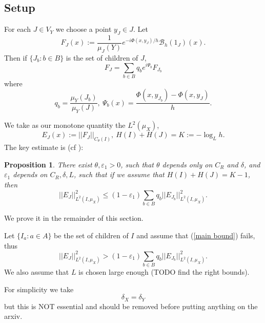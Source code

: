 \documentclass[reqno,10pt]{amsart}
\newtheorem{proposition}[theorem]{Proposition}
\theoremstyle{definition}
\numberwithin{equation}{section}
\begin{document}
\subsection{Setup}
For each $J \in V_Y$ we choose a point $y_J \in J$.
Let
$$F_J(x) := \frac{1}{\mu_J(Y)} e^{-i\Phi(x, y_J)/h} \mathcal B_h(1_J)(x).$$
Then if $\{J_b: b \in B\}$ is the set of children of $J$,
\begin{equation}\label{F versus child}
F_J = \sum_{b \in B} q_b e^{i\Psi_b} F_{J_b}
\end{equation}
where 
$$q_b = \frac{\mu_Y(J_b)}{\mu_Y(J)}, ~\Psi_b(x) = \frac{\Phi(x, y_{J_b}) - \Phi(x, y_J)}{h}.$$

We take as our monotone quantity the $L^2(\mu_X)$,
$$E_J(x) := ||F_J||_{C_\theta(I)}, ~H(I) + H(J) = K := -\log_L h.$$
The key estimate is (cf \cite[(3.11)]{Dyatlov_2018}):

\begin{proposition}
There exist $\theta, \varepsilon_1 > 0$, such that $\theta$ depends only on $C_R$ and $\delta$, and $\varepsilon_1$ depends on $C_R, \delta, L$, such that if we assume that $H(I) + H(J) = K - 1$, then
\begin{equation}\label{main bound}
||E_J||_{L^2(I, \mu_X)}^2 \leq (1 - \varepsilon_1) \sum_{b \in B} q_b ||E_{J_b}||_{L^2(I, \mu_X)}^2.
\end{equation}
\end{proposition}

We prove it in the remainder of this section.

Let $\{I_a: a \in A\}$ be the set of children of $I$ and assume that (\ref{main bound}) fails, thus
\begin{equation}\label{contradicted main bound}
||E_J||_{L^2(I, \mu_X)}^2 > (1 - \varepsilon_1) \sum_{b \in B} q_b ||E_{J_b}||_{L^2(I, \mu_X)}^2.
\end{equation}
We also assume that $L$ is chosen large enough (TODO find the right bounds).

For simplicity we take
$$\delta_X = \delta_Y$$
but this is NOT essential and should be removed before putting anything on the arxiv.
\end{document}
